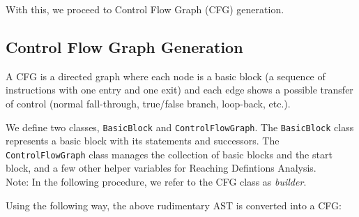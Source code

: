 With this, we proceed to Control Flow Graph (CFG) generation.

\subsection{Control Flow Graph Generation}
A CFG is a directed graph where each node is a basic block (a sequence of
instructions with one entry and one exit) and each edge shows a possible
transfer of control (normal fall-through, true/false branch, loop-back, etc.).

We define two classes, \texttt{BasicBlock} and \texttt{ControlFlowGraph}. The
\texttt{BasicBlock} class represents a basic block with its statements and
successors. The \texttt{ControlFlowGraph} class manages the collection of basic
blocks and the start block, and a few other helper variables for Reaching
Defintions Analysis.\\ \noindent Note: In the following procedure, we refer to
the CFG class as \textit{builder}.

Using the following way, the above rudimentary AST is converted into a CFG:

